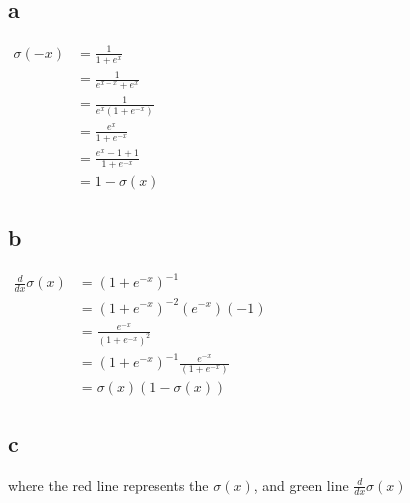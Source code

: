 \documentclass[12pt]{article}
\begin{document}
\subsection*{a}
\begin{center}
    $
        \begin{alignedat}{2}
            \sigma(-x) & =\frac{1}{1+e^x}           \\
                       & = \frac{1}{e^{x-x}+e^x}    \\
                       & = \frac{1}{e^x(1+e^{-x})}  \\
                       & = \frac{e^x}{1+e^{-x}}     \\
                       & = \frac{e^x-1+1}{1+e^{-x}} \\
                       & = 1 - \sigma(x)
        \end{alignedat}
    $
\end{center}

\subsection*{b}
\begin{center}
    $
        \begin{alignedat}{1}
            \frac{d }{dx} \sigma(x) & = (1+e^{-x})^{-1}                           \\
                                    & = (1+e^{-x})^{-2}(e^{-x})(-1)               \\
                                    & = \frac{e^{-x}}{(1+e^{-x})^{2}}             \\
                                    & = (1+e^{-x})^{-1} \frac{e^{-x}}{(1+e^{-x})} \\
                                    & = \sigma (x) (1-\sigma(x))
        \end{alignedat}
    $
\end{center}

\newpage

\subsection*{c}
where the red line represents the $\sigma(x)$, and green line $\frac{d }{dx} \sigma(x)$
\end{document}
